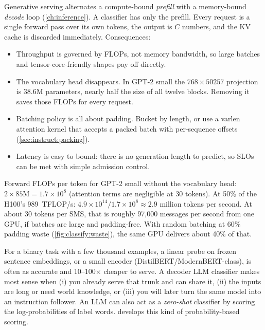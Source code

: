 \begin{systemslens}
Generative serving alternates a compute-bound \emph{prefill} with a memory-bound
\emph{decode} loop (\cref{ch:inference}). A classifier has only the prefill. Every
request is a single forward pass over its own tokens, the output is $C$ numbers, and
the KV cache is discarded immediately. Consequences:
\begin{itemize}
\item Throughput is governed by FLOPs, not memory bandwidth, so large batches and
tensor-core-friendly shapes pay off directly.
\item The vocabulary head disappears. In GPT-2 small the $768\times50257$ projection
is 38.6M parameters, nearly half the size of all twelve blocks. Removing it saves those
FLOPs for every request.
\item Batching policy is all about padding. Bucket by length, or use a varlen
attention kernel that accepts a packed batch with per-sequence offsets
(\cref{sec:instruct:packing}).
\item Latency is easy to bound: there is no generation length to predict, so SLOs can
be met with simple admission control.
\end{itemize}
\end{systemslens}

\begin{napkinmath}
Forward FLOPs per token for GPT-2 small without the vocabulary head:
$2\times 85\text{M} = 1.7\times10^8$ (attention terms are negligible at 30 tokens). At
50\% of the H100's \SI{989}{TFLOP/s}:
$4.9\times10^{14} / 1.7\times10^8 \approx 2.9$ million tokens per second. At about 30
tokens per SMS, that is roughly 97{,}000 messages per second from one GPU, if batches are
large and padding-free. With random batching at 60\% padding waste
(\cref{fig:classify:waste}), the same GPU delivers about 40\% of that.
\end{napkinmath}

\begin{deepdive}
For a binary task with a few thousand examples, a linear probe on frozen sentence
embeddings, or a small encoder (DistilBERT/ModernBERT-class), is often as accurate and
10--100$\times$ cheaper to serve. A decoder LLM classifier makes most sense when (i) you
already serve that trunk and can share it, (ii) the inputs are long or need world
knowledge, or (iii) you will later turn the same model into an instruction follower. An
LLM can also act as a \emph{zero-shot} classifier by scoring the log-probabilities of
label words.  develops this kind of probability-based scoring.
\end{deepdive}

